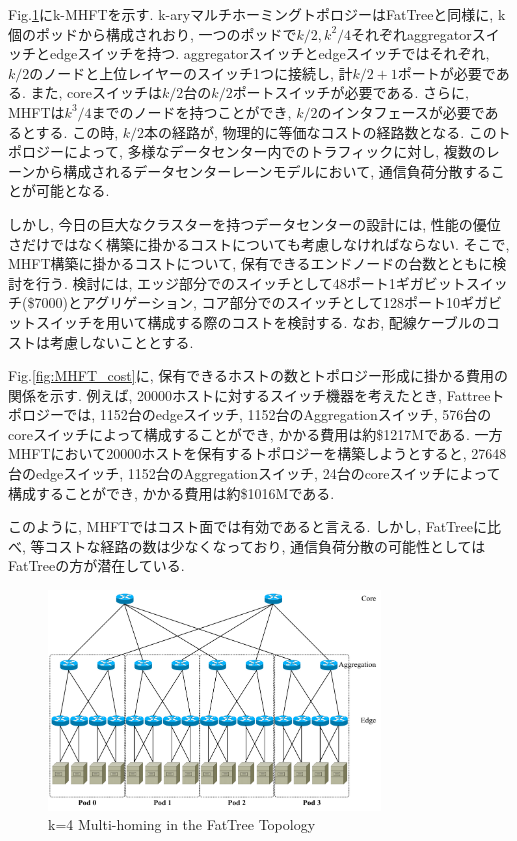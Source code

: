 Fig.\ref{fig:multi-homing}にk-MHFTを示す. 
k-aryマルチホーミングトポロジーはFatTreeと同様に, k個のポッドから構成されおり, 
一つのポッドで$k/2, k^2/4$それぞれaggregatorスイッチとedgeスイッチを持つ. 
aggregatorスイッチとedgeスイッチではそれぞれ,
$k/2$のノードと上位レイヤーのスイッチ1つに接続し, 計$k/2+1$ポートが必要である. 
また, coreスイッチは$k/2$台の$k/2$ポートスイッチが必要である. 
さらに, MHFTは$k^3/4$までのノードを持つことができ, $k/2$のインタフェースが必要であるとする. 
この時, $k/2$本の経路が, 物理的に等価なコストの経路数となる. 
このトポロジーによって, 多様なデータセンター内でのトラフィックに対し, 複数のレーンから構成されるデータセンターレーンモデルにおいて,
通信負荷分散することが可能となる.

しかし, 今日の巨大なクラスターを持つデータセンターの設計には, 性能の優位さだけではなく構築に掛かるコストについても考慮しなければならない. 
そこで, MHFT構築に掛かるコストについて, 保有できるエンドノードの台数とともに検討を行う. 
検討には, エッジ部分でのスイッチとして48ポート1ギガビットスイッチ(\$7000)とアグリゲーション,
コア部分でのスイッチとして128ポート10ギガビットスイッチを用いて構成する際のコストを検討する\cite{fattree}.
なお, 配線ケーブルのコストは考慮しないこととする. 

Fig.\ref{fig:MHFT_cost}に, 保有できるホストの数とトポロジー形成に掛かる費用の関係を示す. 
例えば, 20000ホストに対するスイッチ機器を考えたとき, Fattreeトポロジーでは, 1152台のedgeスイッチ,
1152台のAggregationスイッチ, 576台のcoreスイッチによって構成することができ, かかる費用は約\$1217Mである. 
一方MHFTにおいて20000ホストを保有するトポロジーを構築しようとすると,  27648台のedgeスイッチ,
1152台のAggregationスイッチ, 24台のcoreスイッチによって構成することができ, かかる費用は約\$1016Mである. 

このように, MHFTではコスト面では有効であると言える.
しかし, FatTreeに比べ, 等コストな経路の数は少なくなっており, 通信負荷分散の可能性としてはFatTreeの方が潜在している.

\begin{figure}[t]
    \begin{center}
    \includegraphics[autoebb, width=250pt]{./img/mhft.pdf}
    \caption{k=4 Multi-homing in the FatTree Topology}
    \label{fig:multi-homing}
    \end{center}
\end{figure}

